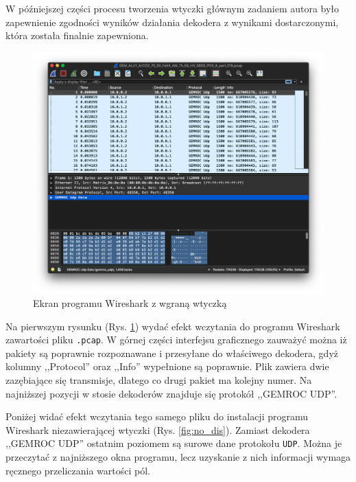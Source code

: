 \documentclass[a4paper, 11pt, twoside, openright]{article}
\begin{document}
	W późniejszej części procesu tworzenia wtyczki głównym zadaniem autora było zapewnienie zgodności wyników działania
	dekodera z wynikami dostarczonymi, która została finalnie zapewniona.

		\begin{figure}[h]
			\centering
				\includegraphics[width=1.0\textwidth]{img/screenshot_dissector.png}
			\caption{Ekran programu Wireshark z wgraną wtyczką}
			\label{fig:dis}
		\end{figure}

	Na pierwszym rysunku (Rys. \ref{fig:dis}) wydać efekt wczytania do programu Wireshark zawartości pliku
	\texttt{.pcap}.
	W górnej części interfejsu graficznego zauważyć można iż pakiety są poprawnie rozpoznawane i przesyłane do właściwego dekodera, gdyż
	kolumny ,,Protocol'' oraz ,,Info'' wypełnione są poprawnie. Plik zawiera dwie zazębiające się transmisje, dlatego co drugi pakiet ma kolejny numer.
	Na najniższej pozycji w stosie dekoderów znajduje się protokół ,,GEMROC UDP''.

	Poniżej widać efekt wczytania tego samego pliku do instalacji programu Wireshark niezawierającej wtyczki (Rys. \ref{fig:no_dis}).
	Zamiast dekodera ,,GEMROC UDP'' ostatnim poziomem są surowe dane protokołu \texttt{UDP}. Można je przeczytać z najniższego okna programu,
	lecz uzyskanie z nich informacji wymaga ręcznego przeliczania wartości pól.
\end{document}
